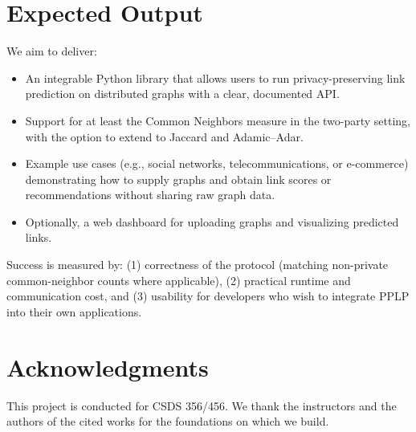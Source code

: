 \documentclass[sigconf]{acmart}
\begin{document}
\section{Expected Output}

We aim to deliver:

\begin{itemize}
  \item An integrable Python library that allows users to run privacy-preserving link prediction on distributed graphs with a clear, documented API.
  \item Support for at least the Common Neighbors measure in the two-party setting, with the option to extend to Jaccard and Adamic--Adar.
  \item Example use cases (e.g., social networks, telecommunications, or e-commerce) demonstrating how to supply graphs and obtain link scores or recommendations without sharing raw graph data.
  \item Optionally, a web dashboard for uploading graphs and visualizing predicted links.
\end{itemize}

Success is measured by: (1) correctness of the protocol (matching non-private common-neighbor counts where applicable), (2) practical runtime and communication cost, and (3) usability for developers who wish to integrate PPLP into their own applications.

\section*{Acknowledgments}
This project is conducted for CSDS 356/456. We thank the instructors and the authors of the cited works for the foundations on which we build.



\end{document}

